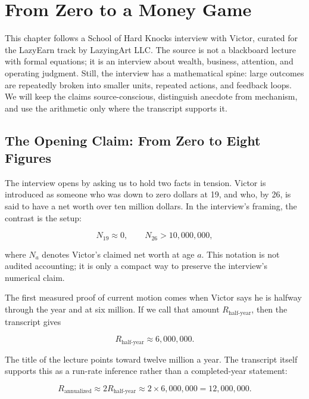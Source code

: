 \chapter{From Zero to a Money Game}

This chapter follows a School of Hard Knocks interview with Victor, curated for the LazyEarn track by LazyingArt LLC. The source is not a blackboard lecture with formal equations; it is an interview about wealth, business, attention, and operating judgment. Still, the interview has a mathematical spine: large outcomes are repeatedly broken into smaller units, repeated actions, and feedback loops. We will keep the claims source-conscious, distinguish anecdote from mechanism, and use the arithmetic only where the transcript supports it.

\section{The Opening Claim: From Zero to Eight Figures}

The interview opens by asking us to hold two facts in tension. Victor is introduced as someone who was down to zero dollars at 19, and who, by 26, is said to have a net worth over ten million dollars. In the interview's framing, the contrast is the setup:

\begin{equation}
N_{19} \approx 0,
\qquad
N_{26} > 10{,}000{,}000,
\end{equation}

where \(N_a\) denotes Victor's claimed net worth at age \(a\). This notation is not audited accounting; it is only a compact way to preserve the interview's numerical claim.

The first measured proof of current motion comes when Victor says he is halfway through the year and at six million. If we call that amount \(R_{\text{half-year}}\), then the transcript gives

\begin{equation}
R_{\text{half-year}} \approx 6{,}000{,}000.
\end{equation}

The title of the lecture points toward twelve million a year. The transcript itself supports this as a run-rate inference rather than a completed-year statement:

\begin{equation}
R_{\text{annualized}}
\approx 2R_{\text{half-year}}
\approx 2 \times 6{,}000{,}000
= 12{,}000{,}000.
\end{equation}

